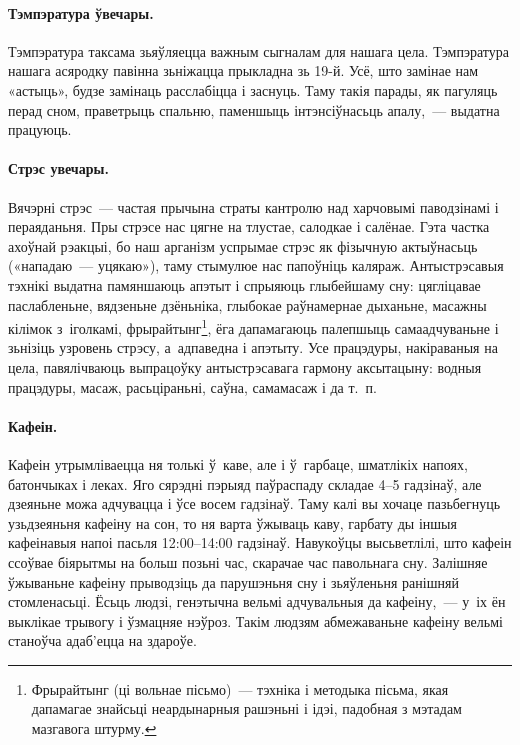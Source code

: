 \paragraph{Тэмпэратура ўвечары.}
Тэмпэратура таксама зьяўляецца важным сыгналам для нашага цела. Тэмпэратура нашага асяродку павінна зьніжацца прыкладна зь 19-й. Усё, што замінае нам «астыць», будзе замінаць расслабіцца і заснуць. Таму такія парады, як пагуляць перад сном, праветрыць спальню, паменшыць інтэнсіўнасьць апалу,~--- выдатна працуюць.

\paragraph{Стрэс увечары.}
Вячэрні стрэс~--- частая прычына страты кантролю над харчовымі паводзінамі і пераяданьня. Пры стрэсе нас цягне на тлустае, салодкае і салёнае. Гэта частка ахоўнай рэакцыі, бо наш арганізм успрымае стрэс як фізычную актыўнасьць («нападаю~--- уцякаю»), таму стымулюе нас папоўніць каляраж. Антыстрэсавыя тэхнікі выдатна памяншаюць апэтыт і спрыяюць глыбейшаму сну: цягліцавае паслабленьне, вядзеньне дзёньніка, глыбокае раўнамернае дыханьне, масажны кілімок з~іголкамі, фрырайтынг\footnote{Фрырайтынг (ці вольнае пісьмо)~--- тэхніка і методыка пісьма, якая дапамагае знайсьці неардынарныя рашэньні і ідэі, падобная з мэтадам мазгавога штурму.}, ёга дапамагаюць палепшыць самаадчуваньне і зьнізіць узровень стрэсу, а~адпаведна і апэтыту. Усе працэдуры, накіраваныя на цела, павялічваюць выпрацоўку антыстрэсавага гармону аксытацыну: водныя працэдуры, масаж, расьціраньні, саўна, самамасаж і да т.~п.

\paragraph{Кафеін.}
Кафеін утрымліваецца ня толькі ў~каве, але і ў~гарбаце, шматлікіх напоях, батончыках і леках. Яго сярэдні пэрыяд паўраспаду складае 4--5 гадзінаў, але дзеяньне можа адчувацца і ўсе восем гадзінаў. Таму калі вы хочаце пазьбегнуць узьдзеяньня кафеіну на сон, то ня варта ўжываць каву, гарбату ды іншыя кафеінавыя напоі пасьля 12:00–14:00 гадзінаў. Навукоўцы высьветлілі, што кафеін ссоўвае біярытмы на больш позьні час, скарачае час павольнага сну. Залішняе ўжываньне кафеіну прыводзіць да парушэньня сну і зьяўленьня ранішняй стомленасьці. Ёсьць людзі, генэтычна вельмі адчувальныя да кафеіну,~--- у~іх ён выклікае трывогу і ўзмацняе нэўроз. Такім людзям абмежаваньне кафеіну вельмі станоўча адаб'ецца на здароўе.


